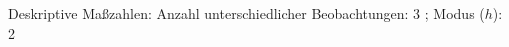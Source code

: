 				\label{tableValues:bstu05h}
				\vspace*{-\baselineskip}
                    \begin{noten}
                	    \note{} Deskriptive Maßzahlen:
                	    Anzahl unterschiedlicher Beobachtungen: 3%
                	    ; 
                	      Modus ($h$): 2
                     \end{noten}


